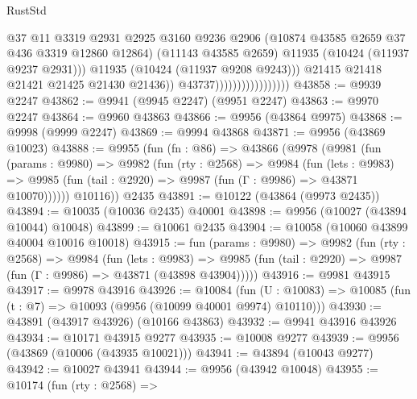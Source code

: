 \begin{lexlean}{RustStd}
\begin{coremodule}
                                              @37
                                              @11
                                              @3319
                                              @2931
                                              @2925
                                              @3160
                                              @9236
                                              @2906
                                              (@10874 @43585 @2659 @37 @436 @3319 @12860 @12864)
                                              (@11143 @43585 @2659)
                                              @11935
                                              (@10424 (@11937 @9237 @2931)))
                                            @11935
                                            (@10424 (@11937 @9208 @9243)))
                                          @21415
                                          @21418
                                          @21421
                                          @21425
                                          @21430
                                          @21436))
                                      @43737)))))))))))))))))
@43858 := @9939 @2247
@43862 := @9941 (@9945 @2247) (@9951 @2247)
@43863 := @9970 @2247
@43864 := @9960 @43863
@43866 := @9956 (@43864 @9975)
@43868 := @9998 (@9999 @2247)
@43869 := @9994 @43868
@43871 := @9956 (@43869 @10023)
@43888 := @9955
    (fun (fn : @86) =>
    @43866
      (@9978
        (@9981
          (fun (params : @9980) =>
          @9982
            (fun (rty : @2568) =>
            @9984
              (fun (lets : @9983) =>
              @9985 (fun (tail : @2920) => @9987 (fun (Γ : @9986) => @43871 @10070))))))
        @10116))
    @2435
@43891 := @10122 (@43864 (@9973 @2435))
@43894 := @10035 (@10036 @2435) @40001
@43898 := @9956 (@10027 (@43894 @10044) @10048)
@43899 := @10061 @2435
@43904 := @10058 (@10060 @43899 @40004 @10016 @10018)
@43915 := fun (params : @9980) =>
  @9982
    (fun (rty : @2568) =>
    @9984
      (fun (lets : @9983) =>
      @9985 (fun (tail : @2920) => @9987 (fun (Γ : @9986) => @43871 (@43898 @43904)))))
@43916 := @9981 @43915
@43917 := @9978 @43916
@43926 := @10084
    (fun (U : @10083) => @10085 (fun (t : @7) => @10093 (@9956 (@10099 @40001 @9974) @10110)))
@43930 := @43891 (@43917 @43926) (@10166 @43863)
@43932 := @9941 @43916 @43926
@43934 := @10171 @43915 @9277
@43935 := @10008 @9277
@43939 := @9956 (@43869 (@10006 (@43935 @10021)))
@43941 := @43894 (@10043 @9277)
@43942 := @10027 @43941
@43944 := @9956 (@43942 @10048)
@43955 := @10174
    (fun (rty : @2568) =>

\end{coremodule}
\end{lexlean}
